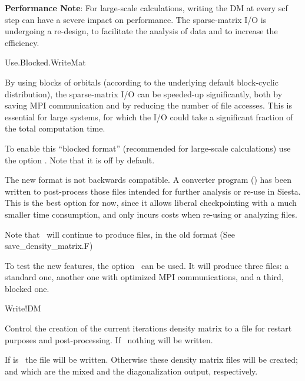 \textbf{Performance Note}: For large-scale calculations, writing the DM
at every scf step can have a severe impact on performance. 
The sparse-matrix I/O is undergoing a re-design, to facilitate the
analysis of data and to increase the efficiency. 

\begin{fdflogicalF}{Use.Blocked.WriteMat}

  By using blocks of orbitals (according to the underlying default
  block-cyclic distribution), the sparse-matrix I/O can be speeded-up
  significantly, both by saving MPI communication and by reducing the
  number of file accesses. This is essential for large systems, for
  which the I/O could take a significant fraction of the total
  computation time.
  
  To enable this ``blocked format'' (recommended for large-scale
  calculations) use the option 
  \fdftrue. Note that it is off by default.
  
  The new format is not backwards compatible. A converter program
  () has been written to
  post-process those files intended for further analysis or re-use in
  Siesta. This is the best option for now, since it allows liberal
  checkpointing with a much smaller time consumption, and only incurs
  costs when re-using or analyzing files.
  
  Note that \tsiesta\ will continue to produce  files, in
  the old format (See save\_density\_matrix.F)

  To test the new features, the option  \fdftrue\ can be
  used. It will produce three files: a standard one, another one with
  optimized MPI communications, and a third, blocked one.

\end{fdflogicalF}

\begin{fdflogicalT}{Write!DM}

  Control the creation of the current iterations density matrix to a
  file for restart purposes and post-processing. If \fdffalse\ nothing
  will be written.

  If  is \fdffalse\ the  file
  will be written. Otherwise these density matrix files will be
  created;  and  which
  are the mixed and the diagonalization output, respectively.

\end{fdflogicalT}


